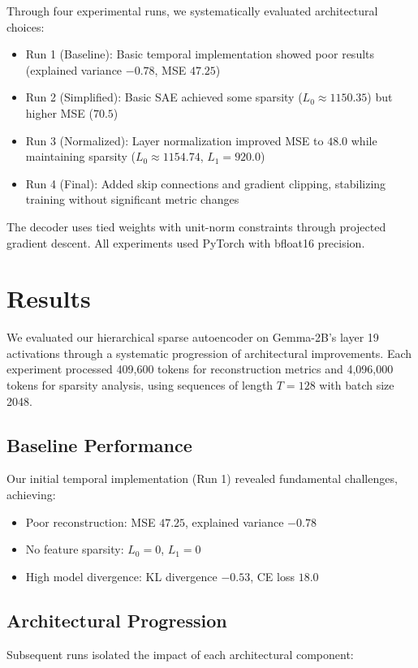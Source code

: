 \documentclass{article} %
\begin{document}
Through four experimental runs, we systematically evaluated architectural choices:
\begin{itemize}
    \item Run 1 (Baseline): Basic temporal implementation showed poor results (explained variance $-0.78$, MSE $47.25$)
    \item Run 2 (Simplified): Basic SAE achieved some sparsity ($L_0 \approx 1150.35$) but higher MSE ($70.5$)
    \item Run 3 (Normalized): Layer normalization improved MSE to $48.0$ while maintaining sparsity ($L_0 \approx 1154.74$, $L_1 = 920.0$)
    \item Run 4 (Final): Added skip connections and gradient clipping, stabilizing training without significant metric changes
\end{itemize}

The decoder uses tied weights with unit-norm constraints through projected gradient descent. All experiments used PyTorch \cite{paszke2019pytorch} with bfloat16 precision.

\section{Results}
\label{sec:results}

We evaluated our hierarchical sparse autoencoder on Gemma-2B's layer 19 activations through a systematic progression of architectural improvements. Each experiment processed 409,600 tokens for reconstruction metrics and 4,096,000 tokens for sparsity analysis, using sequences of length $T=128$ with batch size 2048.

\subsection{Baseline Performance}
Our initial temporal implementation (Run 1) revealed fundamental challenges, achieving:
\begin{itemize}
    \item Poor reconstruction: MSE $47.25$, explained variance $-0.78$
    \item No feature sparsity: $L_0 = 0$, $L_1 = 0$
    \item High model divergence: KL divergence $-0.53$, CE loss $18.0$
\end{itemize}

\subsection{Architectural Progression}
Subsequent runs isolated the impact of each architectural component:
\end{document}
